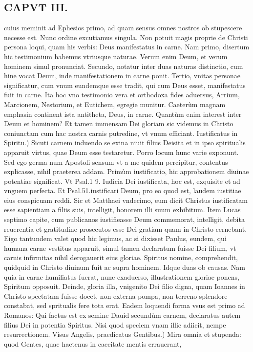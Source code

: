\documentclass{article}
\begin{document}
\begin{pages}
\section*{CAPVT III. }
\marginpar{[ p.41 ]}\pstart cuius meminit ad Ephesios primo, ad quam sensus omnes nostros ob stupescere necesse est. Nunc ordine excutiamus singula. Non potuit magis proprie de Christi persona loqui, quam his verbis: Deus manifestatus in carne. Nam primo, disertum hic testimonium habemus vtriusque naturae. Verum enim Deum, et verum hominem simul pronunciat. Secundo, notatur inter duas naturas distinctio, cum hine vocat Deum, inde manifestationem in carne ponit. Tertio, vnitas personae significatur, cum vnum eundemque esse tradit, qui cum Deus esset, manifestatus fuit in carne. Ita hoc vno testimonio vera et orthodoxa fides aduersus, Arrium, Marcionem, Nestorium, et Eutichem, egregie munitur. Caeterùm magnam emphasin continent ista antitheta, Deus, in carne. Quantùm enim interest inter Deum et hominem? Et tamen immensam Dei gloriam sic videmus in Christo coniunctam cum hac nostra carnis putredine, vt vnum efficiant.  \pend\pstart Iustificatus in Spiritu.) Sicuti carnem induendo se exina niuit filius Deisita et in ipso spiritualis apparuit virtus, quae Deum esse testaretur. Porro locum hunc varie exponunt. Sed ego germa num Apostoli sensum vt a me quidem percipitur, contentus explicasse, nihil praeterea addam. Primùm iustificatio, hic approbationem diuinae potentiae significat. Vt Psal.1 9. Iudicia Dei iustificata, hoc est, exquisite et ad vnguem perfecta. Et Psal.51.iustificari Deum, pro eo quod est, laudem iustitiae eius conspicuam reddi. Sic et Matthaei vndecimo, eum dicit Christus iustificatam esse sapientiam a filiis suis, intelligit, honorem illi suum exhibitum. Item Lucas septimo capite, cum publicanos iustifieasse Deum commemorat, intelligit, debita reuerentia et gratitudine prosecutos esse Dei gratiam quam in Christo cernebant. Eigo tantundem valet quod hic legimus, ac si dixisset Paulus, eundem, qui humana carne vestitus apparuit, simul tamen declaratum fuisse Dei filium, vt carnis infirmitas nihil derogauerit eius gloriae. Spiritus nomine, comprehendit, quidquid in Christo diuinum fuit ac supra hominem. Idque duas ob causas. Nam quia in carne humiliatus fuerat, nunc exaduerso, illustrationem gloriae ponens, Spiritum opposuit. Deinde, gloria illa, vnigenito Dei filio digna, quam Ioannes in Christo spectatam fuisse docet, non externa pompa, non terreno splendore constabat, sed spritualis fere tota erat. Eadem loquendi forma vsus est primo ad Romanos: Qui factus est ex semine Dauid secundùm carnem, declaratus autem filius Dei in potentia Spiritus. Nisi quod speciem vnam illic adiicit, nempe resurrectionem.  \pend\pstart Visus Angelis, praedicatus Gentibus.) Mira omnia et stupenda: quod Gentes, quae hactenus in caecitate mentis errauerant,  \pend

\end{pages}
\end{document}
